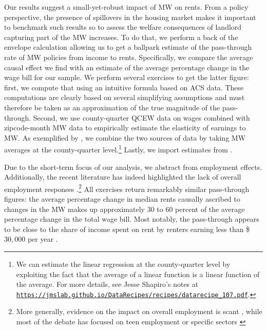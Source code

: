 
Our results suggest a small-yet-robust impact of MW on rents. From a policy perspective, 
the presence of spillovers in the housing market makes it important to benchmark such results 
so to assess the welfare consequences of landlord capturing part of the MW increases. 
To do that, we perform a back of the envelope calculation allowing us to get a ballpark estimate 
of the pass-through rate of MW policies from income to rents. Specifically, we compare the average 
causal effect we find with an estimate of the average percentage change in the wage 
bill for our sample. We perform several exercises to get the latter figure: first, we 
compute that using an intuitive formula based on ACS data. These computations are 
clearly based on several simplifying assumptions and must therefore be taken as an approximation 
of the true magnitude of the pass-through. Second, we use county-quarter QCEW data on wages 
combined with zipcode-month MW data to empirically estimate the elasticity of earnings to MW. 
As exemplified by \textcite{gentzkow2015newspapers}, we combine the two sources of data by 
taking MW averages at the county-quarter level.\footnote{We can estimate the linear 
	regression at the county-quarter level by exploiting the fact that the average of a linear 
	function is a linear function of the average. For more details, see Jesse Shapiro's notes at \href{https://jmslab.github.io/DataRecipes/recipes/datarecipe_107.pdf}{\texttt{https://jmslab.github.io/DataRecipes/recipes/datarecipe\_107.pdf}}.} 
Lastly, we import estimates from \textcite{CegnizEtAl2019}. 

Due to the short-term focus of our analysis, we abstract from employment effects. Additionally, 
the recent literature has indeed highlighted the lack of overall employment responses 
\parencite{CegnizEtAl2019}.\footnote{More generally, evidence on the impact on overall 
	employment is scant \parencite{dube2019impacts}, while most of the debate has focused on 
	teen employment \parencite{card1992using, allegretto2017credible} or specific sectors 
	\parencite{katz1992effect, card2000minimum, dube2010minimum}} All exercises return 
remarkably similar pass-through figures: the average percentage change in median rents causally 
ascribed to changes in the MW makes up approximately $30$ to $60$ percent of the average 
percentage change in the total wage bill. Most notably, the pass-through appears to be close 
to the share of income spent on rent by renters earning less than \$$30,000$ per 
year \parencite{fernald2020americas}.\\

